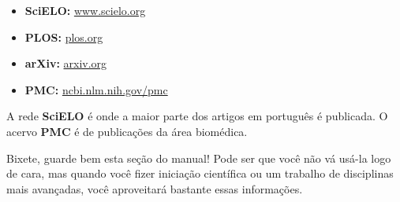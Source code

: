 \begin{itemize}
\item \textbf{SciELO:} \url{www.scielo.org}
\item \textbf{PLOS:} \url{plos.org}
\item \textbf{arXiv:} \url{arxiv.org}
\item \textbf{PMC:} \url{ncbi.nlm.nih.gov/pmc}
\end{itemize}

A rede \textbf{SciELO} é onde a maior parte dos artigos em português é
publicada. O acervo \textbf{PMC} é de publicações da área biomédica.

Bixete, guarde bem esta seção do manual! Pode ser que você não vá usá-la logo
de cara, mas quando você fizer iniciação científica ou um trabalho de
disciplinas mais avançadas, você aproveitará bastante essas informações.
